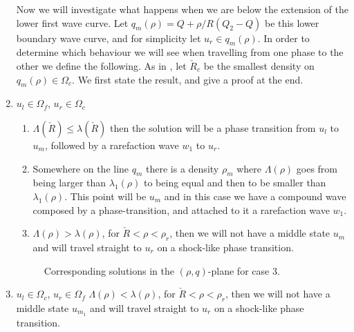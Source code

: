 \documentclass[10pt]{article}
\numberwithin{equation}{section}
\begin{document}
\begin{enumerate}

Now we will investigate what happens when we are below the extension of the lower first wave curve. Let $q_m(\rho) = Q + \rho/R(Q_2 - Q)$ be this lower boundary wave curve, and for simplicity let $u_r \in q_m(\rho)$.
In order to determine which behaviour we will see when travelling from one phase to the other we define the following. As in \cite{Colombo2002}, let $\check R_c$ be the smallest density on $q_m(\rho) \in \Omega_c$. We first state the result, and give a proof at the end. 

\item $u_l \in \Omega_f$, $u_r \in \Omega_c$ 
    \begin{enumerate}
    \item $\Lambda(\check R) \leq \lambda(\check R)$ then the solution will be a phase transition from $u_l$ to $u_{m}$, followed by a rarefaction wave $w_1$ to $u_r$. 
    \item Somewhere on the line $q_m$ there is a density $\rho_m$ where $\Lambda(\rho)$ goes from being larger than $\lambda_1(\rho)$ to being equal and then to be smaller than $\lambda_1(\rho)$. This point will be $u_{m}$ and in this case we have a compound wave composed by a phase-transition, and attached to it a rarefaction wave $w_1$. 
    \item $ \Lambda( \rho) > \lambda(\rho)$, for $\check R < \rho < \rho_r$, then we will not have a middle state $u_{m}$ and will travel straight to $u_r$ on a shock-like phase transition.
    \end{enumerate}
\begin{figure}[H]
    \centering
    
    \caption{Corresponding solutions in the $(\rho, q)$-plane for case $3.$}
    \label{fig:PhTComplexCase1}
\end{figure}
 
\item $u_l \in \Omega_c$, $u_r \in \Omega_f$ \newline
     $ \Lambda( \rho) < \lambda(\rho)$, for $\check R < \rho < \rho_r$, then we will not have a middle state $u_{m_1}$ and will travel straight to $u_r$ on a shock-like phase transition.
\end{enumerate}
\end{document}
